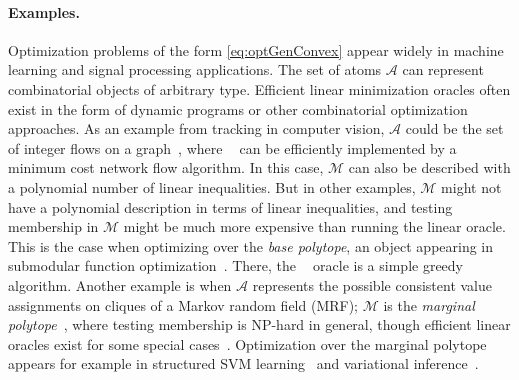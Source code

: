 \documentclass{article} %
\newcommand{\domain}{\mathcal{M}} %
\DeclareMathOperator*{\lmo}{LMO_{\!\Vertices}}
\newcommand{\Vertices}{\mathcal{A}} %
\newcommand{\0}{\mathbf{0}} %
\begin{document}
\paragraph{Examples.} Optimization problems of the form
\eqref{eq:optGenConvex} appear widely in machine learning and signal
processing applications. The set of atoms $\Vertices$ can represent
combinatorial objects of arbitrary type. 
Efficient linear minimization oracles often exist in the form of dynamic
programs or other combinatorial optimization approaches. As an example from
tracking in computer vision, $\Vertices$ could be the set of integer flows on a
graph~\citep{Joulin:2014uw,Chari:2015vo}, where $\lmo$ can be efficiently implemented by a
minimum cost network flow algorithm. In this case, $\domain$ can also be
described with a polynomial number of linear inequalities. But in other
examples, $\domain$ might not have a polynomial description in terms of
linear inequalities, and testing membership in $\domain$ might be much more
expensive than running the linear oracle. This is the case when optimizing
over the \emph{base polytope}, an object appearing in submodular function
optimization~\citep{Bach:2013et}. There, the $\lmo$ oracle is a simple greedy
algorithm. Another example is when $\Vertices$ represents the possible
consistent value assignments on cliques of a Markov random field (MRF);
$\domain$ is the \emph{marginal
polytope}~\citep{wainwright:2008:variational}, where testing membership is
NP-hard in general, though efficient linear oracles exist for some special
cases~\citep{Kolmogorov:2004:graphCut}. Optimization %
over the marginal polytope appears for example in structured SVM
learning~\citep{LacosteJulien:2013ue} and variational %
inference~\citep{Krishnan:2015ws}.\vspace{-2mm}
\end{document}
